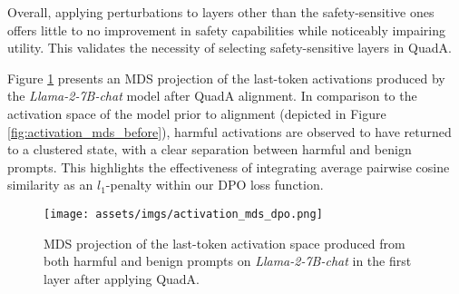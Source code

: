 Overall, applying perturbations to layers other than the safety-sensitive ones offers little to no improvement in safety capabilities while noticeably impairing utility. This validates the necessity of selecting safety-sensitive layers in QuadA.

 Figure \ref{fig:activation_mds_dpo} presents an MDS projection of the last-token activations produced by the \textit{Llama-2-7B-chat} model after QuadA alignment.
In comparison to the activation space of the model prior to alignment (depicted in Figure \ref{fig:activation_mds_before}), harmful activations are observed to have returned to a clustered state, with a clear separation between harmful and benign prompts. This highlights the effectiveness of integrating average pairwise cosine similarity as an $l_1$-penalty within our DPO loss function.

\begin{figure}[!t]
    \centering
    \texttt{[image: assets/imgs/activation\_mds\_dpo.png]} \label{fig:activation_mds_dpo}
    \caption{MDS projection of the last-token activation space produced from both harmful and benign prompts on \textit{Llama-2-7B-chat} in the first layer after applying QuadA.}
    \label{fig:activation_mds_dpo}
\end{figure}

